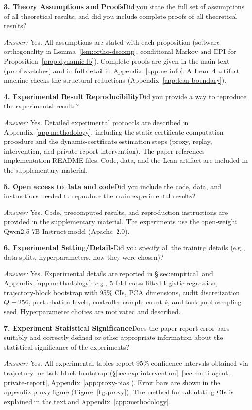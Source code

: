 \documentclass{article}
\begin{document}
\noindent\textbf{3. Theory Assumptions and Proofs}\quad Did you state the full set of assumptions of all theoretical results, and did you include complete proofs of all theoretical results?

\emph{Answer:} Yes. All assumptions are stated with each proposition (software orthogonality in Lemma~\ref{lem:ortho-decomp}, conditional Markov and DPI for Proposition~\ref{prop:dynamic-lb}). Complete proofs are given in the main text (proof sketches) and in full detail in Appendix~\ref{app:netinfo}. A Lean~4 artifact machine-checks the structural reductions (Appendix~\ref{app:lean-boundary}).

\noindent\textbf{4. Experimental Result Reproducibility}\quad Did you provide a way to reproduce the experimental results?

\emph{Answer:} Yes. Detailed experimental protocols are described in Appendix~\ref{app:methodology}, including the static-certificate computation procedure and the dynamic-certificate estimation steps (proxy, replay, intervention, and private-report intervention). The paper references implementation README files. Code, data, and the Lean artifact are included in the supplementary material.

\noindent\textbf{5. Open access to data and code}\quad Did you include the code, data, and instructions needed to reproduce the main experimental results?

\emph{Answer:} Yes. Code, precomputed results, and reproduction instructions are provided in the supplementary material. The experiments use the open-weight Qwen2.5-7B-Instruct model (Apache~2.0).

\noindent\textbf{6. Experimental Setting/Details}\quad Did you specify all the training details (e.g., data splits, hyperparameters, how they were chosen)?

\emph{Answer:} Yes. Experimental details are reported in \S\ref{sec:empirical} and Appendix~\ref{app:methodology}: e.g., 5-fold cross-fitted logistic regression, trajectory-block bootstrap with 95\% CIs, PCA dimensions, audit discretization $Q=256$, perturbation levels, controller sample count $k$, and task-pool sampling seed. Hyperparameter choices are motivated and described.

\noindent\textbf{7. Experiment Statistical Significance}\quad Does the paper report error bars suitably and correctly defined or other appropriate information about the statistical significance of the experiments?

\emph{Answer:} Yes. All experimental tables report 95\% confidence intervals obtained via trajectory- or task-block bootstrap (\S\ref{sec:exp-intervention}--\ref{sec:multi-agent-private-report}, Appendix~\ref{app:proxy-bias}). Error bars are shown in the appendix proxy figure (Figure~\ref{fig:proxy}). The method for calculating CIs is explained in the text and Appendix~\ref{app:methodology}.
\end{document}
